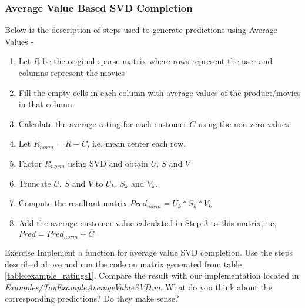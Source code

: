   \subsubsection{Average Value Based SVD Completion} 
  Below is the description of steps used to generate predictions using Average Values -
  \begin{enumerate}
    \item Let $R$ be the original sparse matrix where rows represent the user and columns represent the movies
    \item Fill the empty cells in each column with average values of the product/movies in that column.
    \item Calculate the average rating for each customer $\overline{C}$ using the non zero values
    \item Let $R_{norm} = R - \overline{C}$, i.e. mean center each row. 
    \item Factor $R_{norm}$ using SVD and obtain $U$, $S$ and $V$
    \item Truncate $U$, $S$ and $V$ to $U_k$, $S_k$ and $V_k$.
    \item Compute the resultant matrix $Pred_{norm} = U_k*S_k*V_k$
    \item Add the average customer value calculated in Step 3 to this matrix, i.e, $Pred = Pred_{norm} + \overline{C} $
  \end{enumerate}
\begin{myremark}{Exercise }
Implement a function for average value SVD completion. Use the steps described above and run the code on matrix generated from table \ref{table:example_ratings1}. Compare the result with our implementation located in \textit{Examples/ToyExampleAverageValueSVD.m}. What do you think about the corresponding predictions? Do they make sense? 
\end{myremark}
